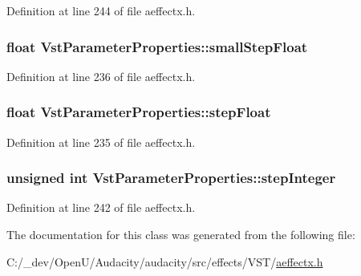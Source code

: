 Definition at line 244 of file aeffectx.\+h.

\subsubsection[{\texorpdfstring{small\+Step\+Float}{smallStepFloat}}]{\setlength{\rightskip}{0pt plus 5cm}float Vst\+Parameter\+Properties\+::small\+Step\+Float}\hypertarget{class_vst_parameter_properties_a824b5575217eada365d3b4e574ee6ff8}{}\label{class_vst_parameter_properties_a824b5575217eada365d3b4e574ee6ff8}


Definition at line 236 of file aeffectx.\+h.

\subsubsection[{\texorpdfstring{step\+Float}{stepFloat}}]{\setlength{\rightskip}{0pt plus 5cm}float Vst\+Parameter\+Properties\+::step\+Float}\hypertarget{class_vst_parameter_properties_af6499b61dddc045cf2a130c269b0f801}{}\label{class_vst_parameter_properties_af6499b61dddc045cf2a130c269b0f801}


Definition at line 235 of file aeffectx.\+h.

\subsubsection[{\texorpdfstring{step\+Integer}{stepInteger}}]{\setlength{\rightskip}{0pt plus 5cm}unsigned {\bf int} Vst\+Parameter\+Properties\+::step\+Integer}\hypertarget{class_vst_parameter_properties_abccf9c793f41f9ecbabe629048740d37}{}\label{class_vst_parameter_properties_abccf9c793f41f9ecbabe629048740d37}


Definition at line 242 of file aeffectx.\+h.



The documentation for this class was generated from the following file\+:\begin{DoxyCompactItemize}
\item 
C\+:/\+\_\+dev/\+Open\+U/\+Audacity/audacity/src/effects/\+V\+S\+T/\hyperlink{aeffectx_8h}{aeffectx.\+h}\end{DoxyCompactItemize}
